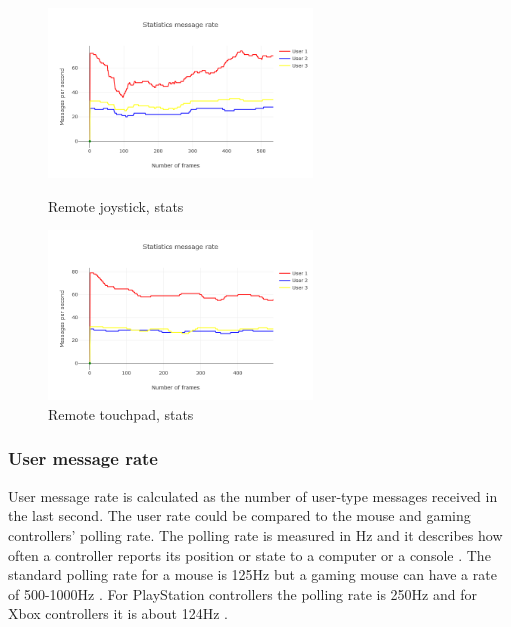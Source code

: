 \documentclass{l4proj}
\begin{document}
\begin{figure}[h!]
    \centering
    \begin{minipage}{0.45\textwidth}
        \centering
        \includegraphics[width=7cm]{./images/rjoysmess.png} %
        \caption{Remote joystick, stats}
        \label{rjoys}
    \end{minipage}\hfill
    \begin{minipage}{0.45\textwidth}
        \centering
        \includegraphics[width=7cm]{./images/rtouchsmess.png} %
        \caption{Remote touchpad, stats}
        \label{rtouchs}
    \end{minipage}
\end{figure}



\subsubsection{User message rate} 
User message rate is calculated as the number of user-type messages received in the last second. The user rate could be compared to the mouse and gaming controllers’ polling rate. The polling rate is measured in Hz and it describes how often a controller reports its position or state to a computer or a console \cite{polling}. The standard polling rate for a mouse is 125Hz but a gaming mouse can have a rate of 500-1000Hz \cite{polling}. For PlayStation controllers the polling rate is 250Hz and for Xbox controllers it is about 124Hz \cite{game_polling}. \par
\end{document}
